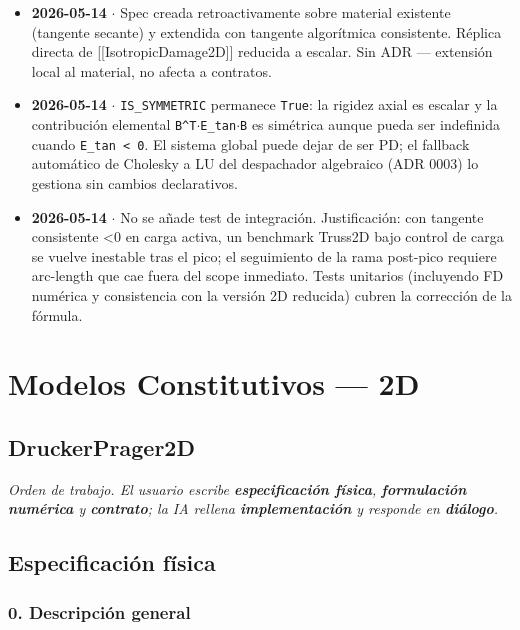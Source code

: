 \documentclass[11pt,letterpaper,oneside]{report}
\begin{document}
\begin{itemize}
  \item \textbf{2026-05-14} \ensuremath{\cdot} Spec creada retroactivamente sobre material existente (tangente secante) y extendida con tangente algorítmica consistente. Réplica directa de [[IsotropicDamage2D]] reducida a escalar. Sin ADR --- extensión local al material, no afecta a contratos.
  \item \textbf{2026-05-14} \ensuremath{\cdot} \texttt{IS\_SYMMETRIC} permanece \texttt{True}: la rigidez axial es escalar y la contribución elemental \texttt{B\textasciicircum{}T\ensuremath{\cdot}E\_tan\ensuremath{\cdot}B} es simétrica aunque pueda ser indefinida cuando \texttt{E\_tan < 0}. El sistema global puede dejar de ser PD; el fallback automático de Cholesky a LU del despachador algebraico (ADR 0003) lo gestiona sin cambios declarativos.
  \item \textbf{2026-05-14} \ensuremath{\cdot} No se añade test de integración. Justificación: con tangente consistente <0 en carga activa, un benchmark Truss2D bajo control de carga se vuelve inestable tras el pico; el seguimiento de la rama post-pico requiere arc-length que cae fuera del scope inmediato. Tests unitarios (incluyendo FD numérica y consistencia con la versión 2D reducida) cubren la corrección de la fórmula.
\end{itemize}


\newpage

\chapter{Modelos Constitutivos — 2D}

\section{DruckerPrager2D}



\textit{Orden de trabajo. El usuario escribe \textbf{especificación física}, \textbf{formulación numérica} y \textbf{contrato}; la IA rellena \textbf{implementación} y responde en \textbf{diálogo}.}



\section{Especificación física}

\subsection{0. Descripción general}
\end{document}
